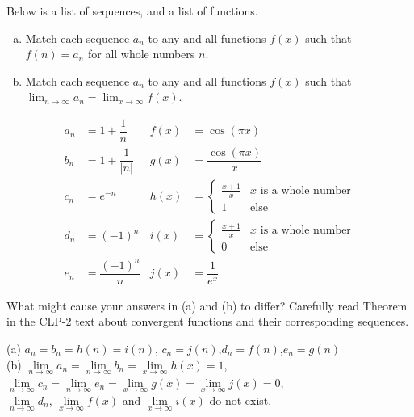 \begin{Mquestion}
Below is a list of sequences, and a list of functions.
\begin{enumerate}[(a)]
\item Match each sequence $a_n$ to any and all functions $f(x)$ such that $f(n)=a_n$ for all whole numbers $n$.
\item Match each sequence $a_n$ to any and all functions $f(x)$ such that $\displaystyle\lim_{n \to \infty}a_n = \lim_{x \to \infty}f(x)$.
\end{enumerate}
\begin{align*}
a_n &= 1+\dfrac{1}{n} & f(x) &= \cos(\pi x)\\
b_n &= 1+\dfrac{1}{|n|}   & g(x) &= \dfrac{\cos (\pi x)}{x}\\
c_n&=e^{-n}  & h(x)&=\begin{cases}\frac{x+1}{x}&x\text{ is a whole number}\\ 1&\text{else} \end{cases}\\
d_n&=(-1)^n  & i(x)&=\begin{cases}\frac{x+1}{x}&x\text{ is a whole number}\\ 0 & \text{else}\end{cases}\\
e_n&=\dfrac{(-1)^n}{n}  &   j(x)&=\dfrac{1}{e^x}
\end{align*}
\end{Mquestion}
\begin{hint}
What might cause your answers in (a) and (b) to differ? Carefully read Theorem~ in the CLP-2 text about convergent functions and their corresponding sequences.
\end{hint}
\begin{answer}
(a) $a_n=b_n=h(n)=i(n)$, \qquad $c_n = j(n)$,\qquad $d_n=f(n)$,\qquad $e_n=g(n)$\\
(b) $\lim\limits_{n \to \infty} a_n=\lim\limits_{n \to \infty} b_n  = \lim\limits_{x \to \infty} h(x)=1$, \qquad $\lim\limits_{n \to \infty} c_n=\lim\limits_{n \to \infty} e_n=\lim\limits_{x \to \infty} g(x) = \lim\limits_{x \to \infty} j(x) =0$,\\
$\lim\limits_{n \to \infty} d_n$,  $\lim\limits_{x\rightarrow\infty} f(x)$  and $\lim\limits_{x\rightarrow\infty} i(x)$ do not exist.
\end{answer}

